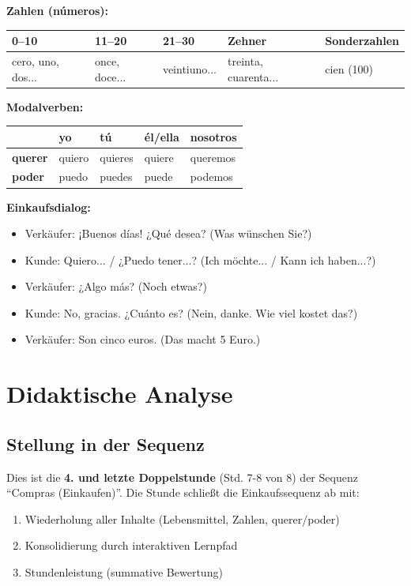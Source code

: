 \documentclass[11pt,a4paper]{article}
\newcommand{\reihenthema}{Compras (Einkaufen)}
\begin{document}
\textbf{Zahlen (números):}
\begin{center}
\begin{tabular}{|l|l|l|l|l|}
\hline
0--10 & 11--20 & 21--30 & Zehner & Sonderzahlen \\
\hline
cero, uno, dos... & once, doce... & veintiuno... & treinta, cuarenta... & cien (100) \\
\hline
\end{tabular}
\end{center}

\textbf{Modalverben:}
\begin{center}
\begin{tabular}{|l|l|l|l|l|}
\hline
& \textbf{yo} & \textbf{tú} & \textbf{él/ella} & \textbf{nosotros} \\
\hline
\textbf{querer} & quiero & quieres & quiere & queremos \\
\hline
\textbf{poder} & puedo & puedes & puede & podemos \\
\hline
\end{tabular}
\end{center}

\textbf{Einkaufsdialog:}
\begin{itemize}
    \item Verkäufer: ¡Buenos días! ¿Qué desea? (Was wünschen Sie?)
    \item Kunde: Quiero... / ¿Puedo tener...? (Ich möchte... / Kann ich haben...?)
    \item Verkäufer: ¿Algo más? (Noch etwas?)
    \item Kunde: No, gracias. ¿Cuánto es? (Nein, danke. Wie viel kostet das?)
    \item Verkäufer: Son cinco euros. (Das macht 5 Euro.)
\end{itemize}

\section{Didaktische Analyse}

\subsection{Stellung in der Sequenz}
Dies ist die \textbf{4. und letzte Doppelstunde} (Std. 7-8 von 8) der Sequenz ``\reihenthema''.
Die Stunde schließt die Einkaufssequenz ab mit:
\begin{enumerate}
    \item Wiederholung aller Inhalte (Lebensmittel, Zahlen, querer/poder)
    \item Konsolidierung durch interaktiven Lernpfad
    \item Stundenleistung (summative Bewertung)
\end{enumerate}
\end{document}
